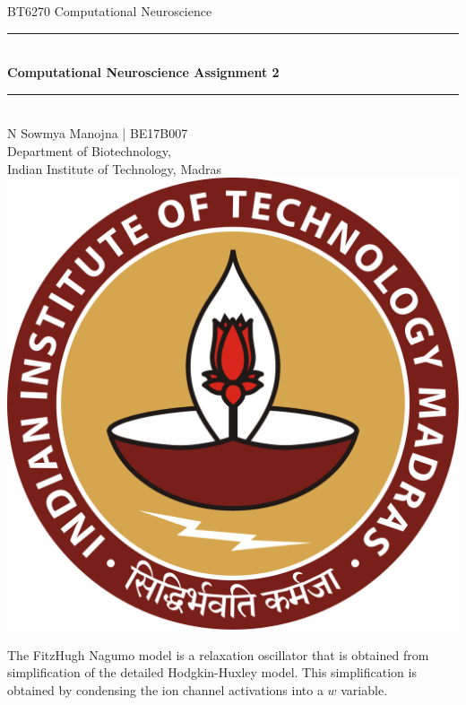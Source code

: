 \documentclass[12pt,a4paper]{article}
\author{N Sowmya Manojna}
\newcommand{\noi}{\noindent}
\begin{document}
\begin{titlepage}
	\begin{center}
		\vspace{3em}
		\large {BT6270 Computational Neuroscience}
		\vspace{10em}

		\rule{0.9\linewidth}{0.5mm} \\[0.4cm]
	    \large{\bfseries{Computational Neuroscience Assignment 2}} \\
	    \rule{0.9\linewidth}{0.5mm} \\[3 em]

	    N Sowmya Manojna | BE17B007\\
		Department of Biotechnology,\\
		Indian Institute of Technology, Madras\\

		\vspace{5em}
		\includegraphics[scale = 0.09]{images/iitmlogo.png}

	\end{center}
\end{titlepage}

\noi
The FitzHugh Nagumo model is a relaxation oscillator \cite{wiki} that is obtained from simplification of the detailed Hodgkin-Huxley model. This simplification is obtained by condensing the ion channel activations into a $w$ variable.\\
\end{document}
